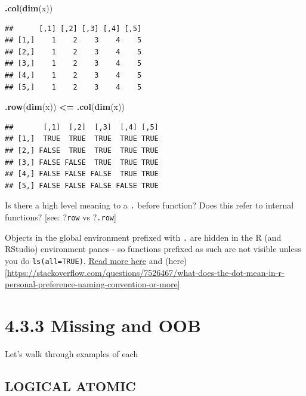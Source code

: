 \documentclass[]{book}
\newenvironment{Shaded}{\begin{snugshade}}{\end{snugshade}}
\newcommand{\KeywordTok}[1]{\textcolor[rgb]{0.13,0.29,0.53}{\textbf{#1}}}
\newcommand{\NormalTok}[1]{#1}
\newcommand{\OperatorTok}[1]{\textcolor[rgb]{0.81,0.36,0.00}{\textbf{#1}}}
\newcommand{\StringTok}[1]{\textcolor[rgb]{0.31,0.60,0.02}{#1}}
\begin{document}
\begin{Shaded}
\begin{Highlighting}[]
\KeywordTok{.col}\NormalTok{(}\KeywordTok{dim}\NormalTok{(x))}
\end{Highlighting}
\end{Shaded}

\begin{verbatim}
##      [,1] [,2] [,3] [,4] [,5]
## [1,]    1    2    3    4    5
## [2,]    1    2    3    4    5
## [3,]    1    2    3    4    5
## [4,]    1    2    3    4    5
## [5,]    1    2    3    4    5
\end{verbatim}

\begin{Shaded}
\begin{Highlighting}[]
\KeywordTok{.row}\NormalTok{(}\KeywordTok{dim}\NormalTok{(x)) }\OperatorTok{<=}\StringTok{ }\KeywordTok{.col}\NormalTok{(}\KeywordTok{dim}\NormalTok{(x))}
\end{Highlighting}
\end{Shaded}

\begin{verbatim}
##       [,1]  [,2]  [,3]  [,4] [,5]
## [1,]  TRUE  TRUE  TRUE  TRUE TRUE
## [2,] FALSE  TRUE  TRUE  TRUE TRUE
## [3,] FALSE FALSE  TRUE  TRUE TRUE
## [4,] FALSE FALSE FALSE  TRUE TRUE
## [5,] FALSE FALSE FALSE FALSE TRUE
\end{verbatim}

Is there a high level meaning to a \texttt{.} before function? Does this refer to internal functions? {[}see: ?\texttt{row} vs ?\texttt{.row}{]}

Objects in the global environment prefixed with \texttt{.} are hidden in the R (and RStudio) environment panes - so functions prefixed as such are not visible unless you do \texttt{ls(all=TRUE)}. \href{https://community.rstudio.com/t/function-argument-naming-conventions-x-vs-x/7764}{Read more here} and (here){[}\url{https://stackoverflow.com/questions/7526467/what-does-the-dot-mean-in-r-personal-preference-naming-convention-or-more}{]}

\hypertarget{missing-and-oob}{%
\section*{4.3.3 Missing and OOB}\label{missing-and-oob}}

Let's walk through examples of each

\hypertarget{logical-atomic}{%
\subsection*{LOGICAL ATOMIC}\label{logical-atomic}}
\end{document}
